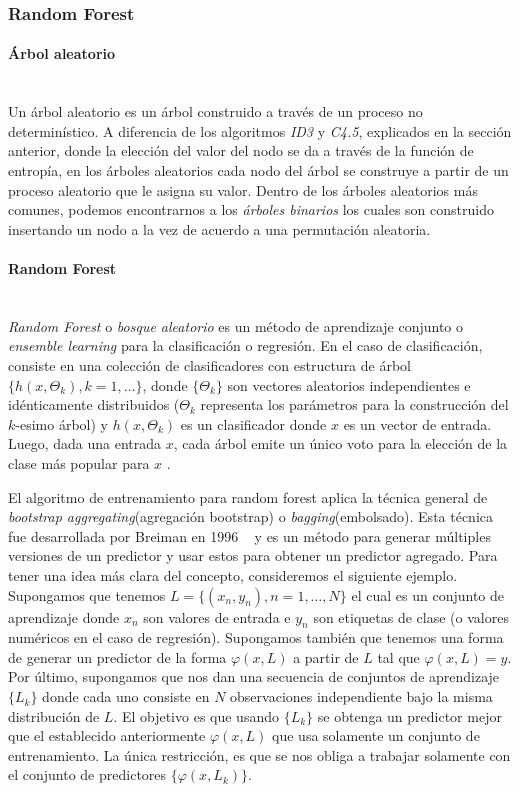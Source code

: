 \subsubsection{Random Forest}

	\paragraph{Árbol aleatorio} ~\\
	
	Un árbol aleatorio es un árbol construido a través de un proceso no determinístico. A diferencia de los algoritmos \textit{ID3} y \textit{C4.5}, explicados en la sección anterior, donde la elección del valor del nodo se da a través de la función de entropía, en los árboles aleatorios cada nodo del árbol se construye a partir de un proceso aleatorio que le asigna su valor. Dentro de los árboles aleatorios más comunes, podemos encontrarnos a  los \textit{árboles binarios} los cuales son construido insertando un nodo a la vez de acuerdo a una permutación aleatoria.

	\paragraph{Random Forest} ~\\

	\textit{Random Forest} o \textit{bosque aleatorio} es un método de aprendizaje conjunto o\textit{ ensemble learning} para la clasificación o regresión. En el caso de clasificación, consiste en una colección de clasificadores con estructura de árbol $\{h(x,\Theta_k), k = 1,\dots\}$, donde $\{\Theta_k\}$ son vectores aleatorios independientes e idénticamente distribuidos ($\Theta_k$ representa los parámetros para la construcción del $k$-esimo árbol) y $h(x,\Theta_k)$ es un clasificador donde $x$ es un vector de entrada. Luego, dada una entrada $x$, cada árbol emite un único voto para la elección de la clase más popular para $x$ \cite{Breiman01}.

	El algoritmo de entrenamiento para random forest aplica la técnica general de \textit{bootstrap aggregating}(agregación bootstrap) o \textit{bagging}(embolsado). Esta técnica fue desarrollada por Breiman en 1996 ~\cite{LBreiman96} y es un método para generar múltiples versiones de un predictor y usar estos para obtener un predictor agregado. Para tener una idea más clara del concepto, consideremos el siguiente ejemplo. Supongamos que tenemos $L = \{ (x_n,y_n), n = 1,\dots, N \}$ el cual es un conjunto de aprendizaje donde $x_n$ son valores de entrada e $y_n$ son etiquetas de clase (o valores numéricos en el caso de regresión). Supongamos también que tenemos una forma de generar un predictor de la forma $\varphi(x,L)$ a partir de $L$ tal que $ \varphi(x,L) = y $. Por último, supongamos que nos dan una secuencia de conjuntos de aprendizaje $\{ L_k \}$ donde cada uno consiste en $N$ observaciones independiente bajo la misma distribución de $L$. El objetivo es que usando $\{ L_k \}$ se obtenga un predictor mejor que el establecido anteriormente $\varphi(x,L)$ que usa solamente un conjunto de entrenamiento. La única restricción, es que se nos obliga a trabajar solamente con el conjunto de predictores $\{ \varphi(x, L_k)\} $.

